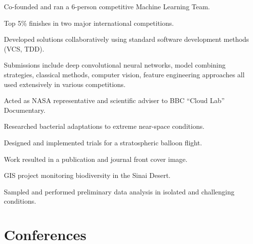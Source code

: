 \documentclass[]{Finlay_Maguire_CV}
\begin{document}
\begin{minipage}[t]{0.66\textwidth}
\begin{tightemize}
\item Co-founded and ran a 6-person competitive Machine Learning Team.
\item Top 5\% finishes in two major international competitions.
\item Developed solutions collaboratively using standard software development methods (VCS, TDD).
\item Submissions include deep convolutional neural networks, model combining strategies, classical methods, computer vision, feature engineering approaches all used extensively in various competitions.
\end{tightemize}
    \vspace{-0.3cm}

\sectionsep
{}
\begin{tightemize}
\item Acted as NASA representative and scientific adviser to BBC ``Cloud Lab'' Documentary.
\item Researched bacterial adaptations to extreme near-space conditions.
\item Designed and implemented trials for a stratospheric balloon flight.
\item Work resulted in a publication and journal front cover image.
\end{tightemize}
\sectionsep
    \vspace{-0.3cm}
\begin{tightemize}
\item GIS project monitoring biodiversity in the Sinai Desert.
\item Sampled and performed preliminary data analysis in isolated and challenging conditions.
\end{tightemize}
\sectionsep
    \vspace{-0.3cm}

\section{Conferences}


\end{minipage}
\end{document}
